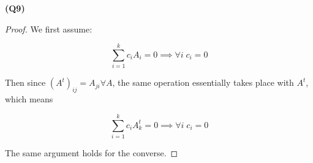 \documentclass[12pt, a4paper]{article}
\begin{document}
\textbf{(Q9)}

\begin{proof}
    We first assume:

    \[
        \sum_{i = 1}^{k} c_iA_i = 0 \implies \forall i \; c_i = 0
    \]

    Then since $(A^t)_{ij} = A_{ji} \forall A$, the same
    operation essentially takes place with $A^t$, which means

    \[
        \sum_{i = 1}^{k} c_iA^{t}_{k} = 0 \implies \forall i \; c_i = 0
    \]

    The same argument holds for the converse.
\end{proof}
\end{document}
